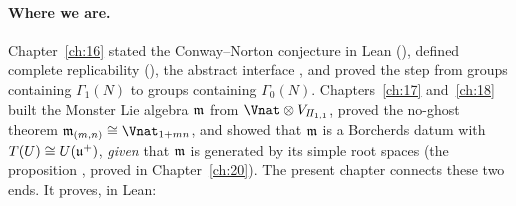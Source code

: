 \paragraph{Where we are.}  Chapter~\ref{ch:16} stated the Conway--Norton conjecture in Lean
(), defined complete replicability (), the abstract interface
, and proved the step from groups containing $\Gamma_1(N)$ to groups containing $\Gamma_0(N)$.
Chapters~\ref{ch:17} and~\ref{ch:18} built the Monster Lie algebra $\mathfrak{m}$ from $\Vnat\otimes V_{I\!I_{1,1}}$, proved
the no-ghost theorem $\chnineteenm_{(m,n)}\cong\Vnat_{1+mn}$, and showed that $\mathfrak{m}$ is a Borcherds datum with
$T(U)\cong U(\mathfrak{u}^+)$, \emph{given} that $\mathfrak{m}$ is generated by its simple root spaces (the proposition
, proved in Chapter~\ref{ch:20}).  The present chapter connects these two ends.
It proves, in Lean:
